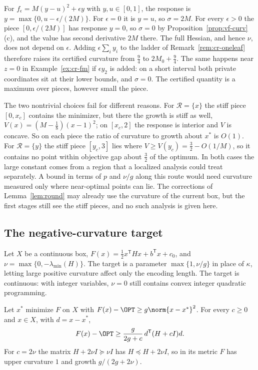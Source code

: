 \begin{remark}\label{rem:cr-unstable}
For $f_\epsilon=M(y-u)^2+\epsilon y$ with $y,u\in[0,1]$, the response is
$y=\max\{0,u-\epsilon/(2M)\}$. For $\epsilon=0$ it is $y=u$, so $\sigma=2M$.
For every $\epsilon>0$ the piece $[0,\epsilon/(2M)]$ has response $y=0$, so
$\sigma=0$ by Proposition~\ref{prop:vf-curv}(c), and the value has second
derivative $2M$ there. The full Hessian, and hence $\nu$, does not depend on
$\epsilon$. Adding $\epsilon\sum_iy_i$ to the ladder of
Remark~\ref{rem:cr-oneleaf} therefore raises its certified curvature from
$\frac94$ to $2M_0+\frac94$. The same happens near $z=0$ in
Example~\ref{ex:cr-fm} if $\epsilon y_2$ is added: on a short interval both
private coordinates sit at their lower bounds, and $\sigma=0$. The certified
quantity is a maximum over pieces, however small the piece.
\end{remark}

The two nontrivial choices fail for different reasons. For
$\mathcal R=\{x\}$ the stiff piece $[0,x_c]$ contains the minimizer, but there
the growth is stiff as well, $V(x)=(M-\frac18)(x-1)^2$; on $[x_c,2]$ the
response is interior and $V$ is concave. So on each piece the ratio of
curvature to growth about $x^*$ is $O(1)$. For $\mathcal R=\{y\}$ the stiff
piece $[y_c,3]$ lies where $V\ge V(y_c)=\frac32-O(1/M)$, so it contains no
point within objective gap about $\frac32$ of the optimum. In both cases the
large constant comes from a region that a localized analysis could treat
separately. A bound in terms of $p$ and $\nu/g$ along this route would need
curvature measured only where near-optimal points can lie. The corrections of
Lemma~\ref{lem:round} may already use the curvature of the current box, but
the first stages still see the stiff pieces, and no such analysis is given
here.

\subsection{The negative-curvature target}

Let $X$ be a continuous box, $F(x)=\frac12x^{\mathsf T}Hx+b^{\mathsf T}x+c_0$, and
$\nu=\max\{0,-\lambda_{\min}(H)\}$. The target is a parameter
$\max\{1,\nu/g\}$ in place of $\kappa$, letting large positive curvature affect
only the encoding length. The target is continuous: with integer variables,
$\nu=0$ still contains convex integer quadratic programming.

\begin{lemma}\label{lem:cr-energy}
Let $x^*$ minimize $F$ on $X$ with $F(x)-\OPT\ge g\norm{x-x^*}^2$. For every
$c\ge0$ and $x\in X$, with $d=x-x^*$,
\[
F(x)-\OPT\ge\frac{g}{2g+c}\,d^{\mathsf T}(H+cI)d.
\]
For $c=2\nu$ the matrix $H+2\nu I\succeq\nu I$ has $H\preceq H+2\nu I$, so in its
metric $F$ has upper curvature $1$ and growth $g/(2g+2\nu)$.
\end{lemma}

